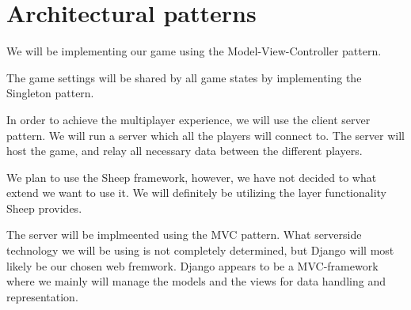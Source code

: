 \section{Architectural patterns} 
\label{architecturalpatterns}

We will be implementing our game using the Model-View-Controller pattern. 

The game settings will be shared by all game states by implementing the Singleton pattern. 

In order to achieve the multiplayer experience, we will use the client server pattern. We will run a server which all the players will connect to. The server will host the game, and relay all necessary data between the different players. 

We plan to use the Sheep framework, however, we have not decided to what extend we want to use it. We will definitely be utilizing the layer functionality Sheep provides.

The server will be implmeented using the MVC pattern. What serverside technology we will be using is not completely determined, but Django will most likely be our chosen web fremwork. Django appears to be a MVC-framework where we mainly will manage the models and the views for data handling and representation.